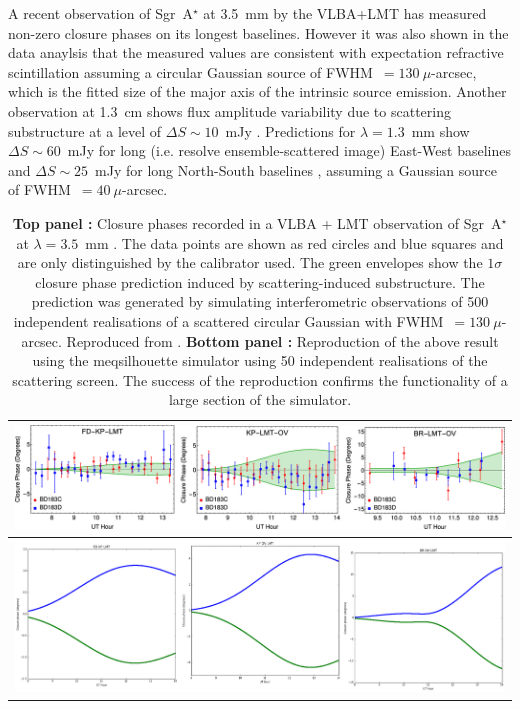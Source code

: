 A recent observation of Sgr~A$^\star$ at 3.5~mm by the VLBA+LMT \citep[see Fig.~\ref{fig:substructure2}][]{Ortiz_2016} has measured non-zero closure phases on its longest baselines. However it was also shown in the data anaylsis that the measured values are consistent with expectation refractive scintillation assuming a circular Gaussian source of FWHM~$=130\ \mu$-arcsec, which is the fitted size of the major axis of the intrinsic source emission. Another observation at 1.3~cm shows flux amplitude variability due to scattering substructure at a level of $\Delta S \sim 10$~mJy \citep{Gwinn_2014}. Predictions for $\lambda = 1.3$~mm show $\Delta S \sim 60$~mJy for long (i.e. resolve ensemble-scattered image) East-West baselines and $\Delta S \sim 25$~mJy for long North-South baselines \citep*{Johnson_2015a}, assuming a Gaussian source of FWHM~$=40\ \mu$-arcsec.


\begin{table}[h!]
\begin{tabular}{c}
\includegraphics[width=\columnwidth]{Images/ism_cp}\\
\hline
\includegraphics[width=\columnwidth]{Images/ortizrepeat}\\
\end{tabular}
\caption{{\bf Top panel :} Closure phases recorded in a VLBA + LMT observation of  Sgr~A$^\star$ at $\lambda = 3.5$~mm \protect\citep{Ortiz_2016}. The data points are shown as red circles and blue squares and are only distinguished by the calibrator used. The green envelopes show the $1\sigma$ closure phase prediction induced by scattering-induced substructure. The prediction was generated by simulating interferometric observations of 500 independent realisations of a scattered circular Gaussian with FWHM~$=130\ \mu$-arcsec. Reproduced from \protect\citet{Ortiz_2016}. {\bf Bottom panel :} Reproduction of the above result using the {\sc meqsilhouette} simulator using 50 independent realisations of the scattering screen. The success of the reproduction confirms the functionality of a large section of the simulator.\label{fig:substructure2}
}

\end{table}


